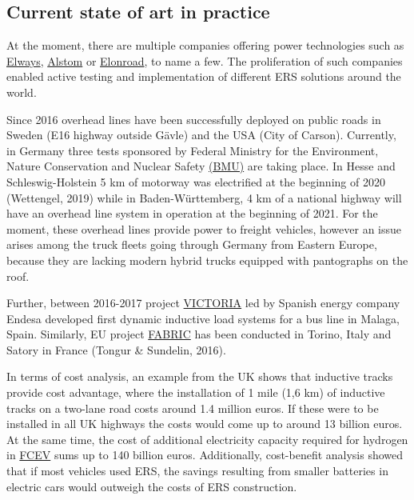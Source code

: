 \documentclass[
]{book}
\begin{document}
\hypertarget{current-state-of-art-in-practice-2}{%
\subsection*{Current state of art in practice}\label{current-state-of-art-in-practice-2}}

At the moment, there are multiple companies offering power technologies such as \href{https://elways.se/}{Elways}, \href{https://www.alstom.com/}{Alstom} or \href{https://elonroad.com/}{Elonroad}, to name a few. The proliferation of such companies enabled active testing and implementation of different ERS solutions around the world.

Since 2016 overhead lines have been successfully deployed on public roads in Sweden (E16 highway outside Gävle) and the USA (City of Carson). Currently, in Germany three tests sponsored by Federal Ministry for the Environment, Nature Conservation and Nuclear Safety \href{www.bmu.de}{(BMU)} are taking place. In Hesse and Schleswig-Holstein 5 km of motorway was electrified at the beginning of 2020 (Wettengel, 2019) while in Baden-Württemberg, 4 km of a national highway will have an overhead line system in operation at the beginning of 2021. For the moment, these overhead lines provide power to freight vehicles, however an issue arises among the truck fleets going through Germany from Eastern Europe, because they are lacking modern hybrid trucks equipped with pantographs on the roof.

Further, between 2016-2017 project \href{https://www.fcirce.es/en/smart-mobility-en-en/victoria-2}{VICTORIA} led by Spanish energy company Endesa developed first dynamic inductive load systems for a bus line in Malaga, Spain. Similarly, EU project \href{https://trimis.ec.europa.eu/project/feasibility-analysis-and-development-road-charging-solutions-future-electric-vehicles}{FABRIC} has been conducted in Torino, Italy and Satory in France (Tongur \& Sundelin, 2016).

In terms of cost analysis, an example from the UK shows that inductive tracks provide cost advantage, where the installation of 1 mile (1,6 km) of inductive tracks on a two-lane road costs around 1.4 million euros. If these were to be installed in all UK highways the costs would come up to around 13 billion euros. At the same time, the cost of additional electricity capacity required for hydrogen in \protect\hyperlink{FCEV}{FCEV} sums up to 140 billion euros. Additionally, cost-benefit analysis showed that if most vehicles used ERS, the savings resulting from smaller batteries in electric cars would outweigh the costs of ERS construction.
\end{document}
